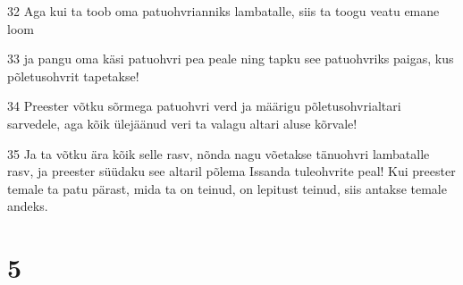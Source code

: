 \par 32 Aga kui ta toob oma patuohvrianniks lambatalle, siis ta toogu veatu emane loom
\par 33 ja pangu oma käsi patuohvri pea peale ning tapku see patuohvriks paigas, kus põletusohvrit tapetakse!
\par 34 Preester võtku sõrmega patuohvri verd ja määrigu põletusohvrialtari sarvedele, aga kõik ülejäänud veri ta valagu altari aluse kõrvale!
\par 35 Ja ta võtku ära kõik selle rasv, nõnda nagu võetakse tänuohvri lambatalle rasv, ja preester süüdaku see altaril põlema Issanda tuleohvrite peal! Kui preester temale ta patu pärast, mida ta on teinud, on lepitust teinud, siis antakse temale andeks.

\chapter{5}

